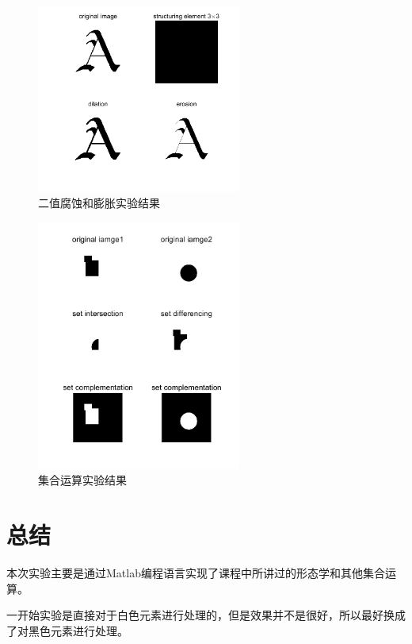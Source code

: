\documentclass{../source/Experiment}
\begin{document}
        \begin{figure}[H]
            \centering
            \includegraphics[width = 0.6\textwidth]{第四次/f1.png}
            \caption{二值腐蚀和膨胀实验结果}
        \end{figure}

        \begin{figure}[H]
            \centering
            \includegraphics[width = 0.6\textwidth]{第四次/f2.png}
            \caption{集合运算实验结果}
        \end{figure}

    \section{总结}
    本次实验主要是通过Matlab编程语言实现了课程中所讲过的形态学和其他集合运算。
    
    一开始实验是直接对于白色元素进行处理的，但是效果并不是很好，所以最好换成了对黑色元素进行处理。
\end{document}
